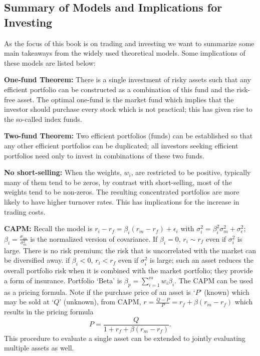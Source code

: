 \subsection{Summary of Models and Implications for Investing}

As the focus of this book is on trading and investing we want to summarize some main takeaways from the widely used theoretical models. Some implications of these models are listed below: \twomedskip


\noindent\textbf{One-fund Theorem:} There is a single investment of risky assets such that any efficient portfolio can be constructed as a combination of this fund and the risk-free asset. The optimal one-fund is the market fund which implies that the investor should purchase every stock which is not practical; this has given rise to the so-called index funds. \twomedskip


\noindent\textbf{Two-fund Theorem:} Two efficient portfolios (funds) can be established so that any other efficient portfolios can be duplicated; all investors seeking efficient portfolios need only to invest in combinations of these two funds. \twomedskip


\noindent\textbf{No short-selling:} When the weights, $w_i$, are restricted to be positive, typically many of them tend to be zeros, by contrast with short-selling, most of the weights tend to be non-zeros. The resulting concentrated portfolios are more likely to have higher turnover rates. This has implications for the increase in trading costs. \twomedskip


\noindent\textbf{CAPM:} Recall the model is $r_i - r_f= \beta_i (r_m-r_f)+\epsilon_i$ with $\sigma_i^2= \beta_i^2\sigma^2_m + \sigma_\epsilon^2$; $\beta_i= \frac{\sigma_{im}}{\sigma_m^2}$ is the normalized version of covariance. If $\beta_i= 0$, $r_i \sim r_f$ even if $\sigma_i^2$ is large. There is no risk premium; the risk that is uncorrelated with the market can be diversified away. if $\beta_i < 0$, $r_i<r_f$ even if $\sigma_i^2$ is large; such an asset reduces the overall portfolio risk when it is combined with the market portfolio; they provide a form of insurance. Portfolio `Beta' is $\beta_p= \sum_{i=1}^m w_i \beta_i$. The CAPM can be used as a pricing formula. Note if the purchase price of an asset is `$P$' (known) which may be sold at `$Q$' (unknown), from CAPM, $r= \frac{Q-P}{P}= r_f+\beta(r_m - r_f)$ which results in the pricing formula
	\begin{equation}\label{eqn:pricing}
	P=\dfrac{Q}{1 + r_f + \beta(r_m - r_f)}.
	\end{equation}
This procedure to evaluate a single asset can be extended to jointly evaluating multiple assets as well. \twomedskip


